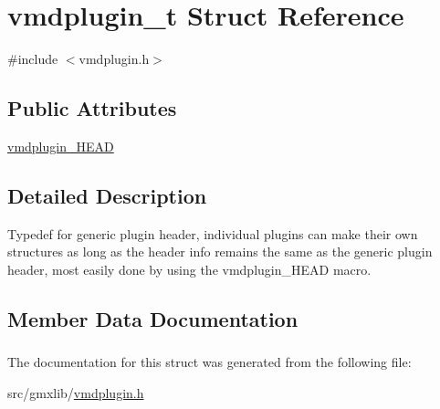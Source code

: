 \hypertarget{structvmdplugin__t}{\section{vmdplugin\-\_\-t \-Struct \-Reference}
\label{structvmdplugin__t}
}


{\ttfamily \#include $<$vmdplugin.\-h$>$}

\subsection*{\-Public \-Attributes}
\begin{DoxyCompactItemize}
\item 
\hyperlink{structvmdplugin__t_afd701c0720d39d6f55864901f88eb7f6}{vmdplugin\-\_\-\-H\-E\-A\-D}
\end{DoxyCompactItemize}


\subsection{\-Detailed \-Description}
\-Typedef for generic plugin header, individual plugins can make their own structures as long as the header info remains the same as the generic plugin header, most easily done by using the vmdplugin\-\_\-\-H\-E\-A\-D macro. 

\subsection{\-Member \-Data \-Documentation}
\hypertarget{structvmdplugin__t_afd701c0720d39d6f55864901f88eb7f6}{
\subsubsection[{vmdplugin\-\_\-\-H\-E\-A\-D}]{}}\label{structvmdplugin__t_afd701c0720d39d6f55864901f88eb7f6}


\-The documentation for this struct was generated from the following file\-:\begin{DoxyCompactItemize}
\item 
src/gmxlib/\hyperlink{vmdplugin_8h}{vmdplugin.\-h}\end{DoxyCompactItemize}
